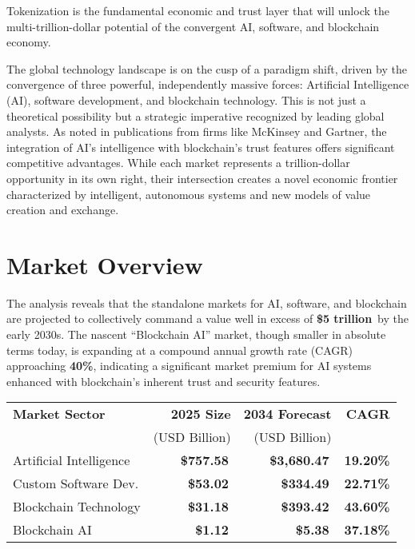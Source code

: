 \documentclass[11pt,a4paper]{report}
\newcommand{\marketvalue}[2]{\textcolor{trust}{\textbf{\$#1}}\,\textcolor{darkgray}{#2}}
\newcommand{\cagr}[1]{\textcolor{sun}{\textbf{#1\%}}}
\begin{document}
\begin{keypoint}
Tokenization is the fundamental economic and trust layer that will unlock the multi-trillion-dollar potential of the convergent AI, software, and blockchain economy.
\end{keypoint}

The global technology landscape is on the cusp of a paradigm shift, driven by the convergence of three powerful, independently massive forces: Artificial Intelligence (AI), software development, and blockchain technology. This is not just a theoretical possibility but a strategic imperative recognized by leading global analysts. As noted in publications from firms like McKinsey and Gartner, the integration of AI's intelligence with blockchain's trust features offers significant competitive advantages. While each market represents a trillion-dollar opportunity in its own right, their intersection creates a novel economic frontier characterized by intelligent, autonomous systems and new models of value creation and exchange.

\section*{Market Overview}
The analysis reveals that the standalone markets for AI, software, and blockchain are projected to collectively command a value well in excess of \marketvalue{5 trillion}{} by the early 2030s. The nascent ``Blockchain AI'' market, though smaller in absolute terms today, is expanding at a compound annual growth rate (CAGR) approaching \cagr{40}, indicating a significant market premium for AI systems enhanced with blockchain's inherent trust and security features.

\begin{marketfigure}
\centering
\begin{tabular}{lrrr}
\toprule
\textbf{Market Sector} & \textbf{2025 Size} & \textbf{2034 Forecast} & \textbf{CAGR} \\
& (USD Billion) & (USD Billion) & \\
\midrule
Artificial Intelligence & \marketvalue{757.58}{} & \marketvalue{3,680.47}{} & \cagr{19.20} \\
Custom Software Dev. & \marketvalue{53.02}{} & \marketvalue{334.49}{} & \cagr{22.71} \\
Blockchain Technology & \marketvalue{31.18}{} & \marketvalue{393.42}{} & \cagr{43.60} \\
Blockchain AI & \marketvalue{1.12}{} & \marketvalue{5.38}{} & \cagr{37.18} \\
\bottomrule
\end{tabular}
\end{marketfigure}
\end{document}
